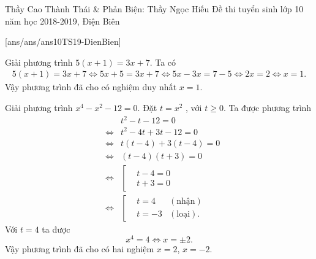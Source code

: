 
\begin{name}
{Thầy  Cao Thành Thái \& Phản Biện: Thầy Ngọc Hiếu}
{Đề thi tuyển sinh lớp 10 năm học 2018-2019, Điện Biên}
\end{name}
\setcounter{ex}{0}
[ans/ans/ans10TS19-DienBien]

\begin{ex}%
 	Giải phương trình $5(x+1)=3x+7$.
 	\loigiai
 	 {
  		Ta có
  		\begin{eqnarray*}
  		 5(x+1)=3x+7 \Leftrightarrow 5x+5=3x+7 \Leftrightarrow 5x-3x=7-5 \Leftrightarrow 2x=2 \Leftrightarrow x=1.
  		\end{eqnarray*}
  		Vậy phương trình đã cho có nghiệm duy nhất $x=1$.
 	 }
\end{ex}

\begin{ex}%
	Giải phương trình $x^4-x^2-12=0$.
	\loigiai
	{
	Đặt $t=x^2$	, với $t\geq 0$. Ta được phương trình
	\begin{eqnarray*}
	&& t^2-t-12=0 \\
	&\Leftrightarrow & t^2-4t+3t-12=0 \\
	&\Leftrightarrow & t(t-4)+3(t-4)=0 \\
	&\Leftrightarrow & (t-4)(t+3)=0 \\
	&\Leftrightarrow & \left[\begin{aligned}&t-4=0 \\&t+3=0\end{aligned}\right.\\
	&\Leftrightarrow & \left[\begin{aligned}&t=4 & (\text{nhận})\\&t=-3 &(\text{loại}).\end{aligned}\right.
	\end{eqnarray*}
	Với $t=4$ ta được
	$$x^4=4 \Leftrightarrow x=\pm 2.$$
	Vậy phương trình đã cho có hai nghiệm $x=2$, $x=-2$.
	}
\end{ex}

